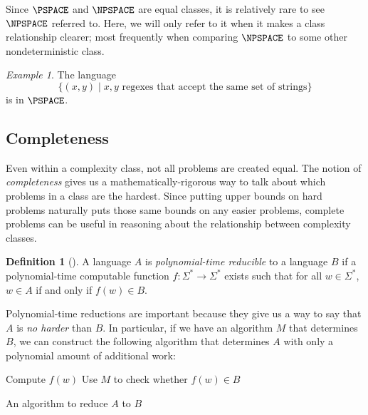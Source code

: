 \documentclass[english,12pt]{reedthesis}
\theoremstyle{plain}
\theoremstyle{definition}
\newtheorem{defn}[defn]{Definition}
\theoremstyle{remark}
\newtheorem{example}{Example}[thm]
\begin{document}
Since $\PSPACE$ and $\NPSPACE$ are equal classes, it is relatively rare to see
$\NPSPACE$ referred to. Here, we will only refer to it when it makes a class
relationship clearer; most frequently when comparing $\NPSPACE$ to some other
nondeterministic class.

\begin{example}\label{ex:regex-is-pspace}
  The language
  \[
    \{(x, y) \mid x, y \text{ regexes that accept the same set of strings}\}
  \]
  is in $\PSPACE$. %
\end{example}



\subsection{Completeness}

Even within a complexity class, not all problems are created equal. The notion
of \emph{completeness} gives us a mathematically-rigorous way to talk about
which problems in a class are the hardest. Since putting upper bounds on hard
problems naturally puts those same bounds on any easier problems, complete
problems can be useful in reasoning about the relationship between complexity
classes.

\begin{defn}[{\cite[Def.\ 7.29]{Sip97}}]\label{def:p-reduction}
  A language $A$ is \emph{polynomial-time reducible} to a language $B$ if a
  polynomial-time computable function $f\colon \Sigma^{*} \rightarrow \Sigma^{*}$ exists
  such that for all $w \in \Sigma^{*}$, $w \in A$ if and only if $f(w) \in B$.
\end{defn}

Polynomial-time reductions are important because they give us a way to say that
$A$ is \emph{no harder} than $B$. In particular, if we have an algorithm $M$
that determines $B$, we can construct the following algorithm that determines
$A$ with only a polynomial amount of additional work:

\begin{algorithm}[H]
  Compute $f(w)$\;
  Use $M$ to check whether $f(w) \in B$\;
  \;
  \caption{An algorithm to reduce $A$ to $B$}
\end{algorithm}
\end{document}

